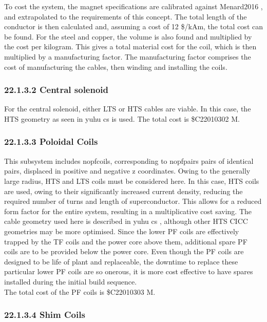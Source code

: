 To cost the system, the magnet specifications are calibrated against Menard2016
, and extrapolated to the requirements of this concept. The total length of the conductor is then calculated and, assuming a cost of 12 \$/kAm, the total cost can be found. For the steel and copper, the volume is also found and multiplied by the cost per kilogram. This gives a total material cost for the coil, which is then multiplied by a manufacturing factor. The manufacturing factor comprises the cost of manufacturing the cables, then winding and installing the coils.

\subsubsection*{22.1.3.2 Central solenoid}

For the central solenoid, either LTS or HTS cables are viable. In this case, the HTS geometry as seen in yuhu cs
is used. The total cost is \$C22010302 M.

\subsubsection*{22.1.3.3 Poloidal Coils}

This subsystem includes nopfcoils, corresponding to nopfpairs pairs of identical pairs, displaced in positive and negative z coordinates. Owing to the generally large radius, HTS and LTS coils must be considered here. In this case, HTS coils are used, owing to their significantly increased current density, reducing the required number of turns and length of superconductor. This allows for a reduced form factor for the entire system, resulting in a multiplicative
cost saving. The cable geometry used here is described in yuhu cs
, although other HTS CICC geometries may be more optimised.
Since the lower PF coils are effectively trapped by the TF coils and the power core above them, additional spare PF coils are to be provided below the power core. Even though the PF coils are designed to be life of plant and replaceable, the downtime to replace these particular lower PF coils are so onerous, it is more cost effective to have spares installed during the initial build sequence.  \\

The total cost of the PF coils is \$C22010303 M.

\subsubsection*{22.1.3.4 Shim Coils}

